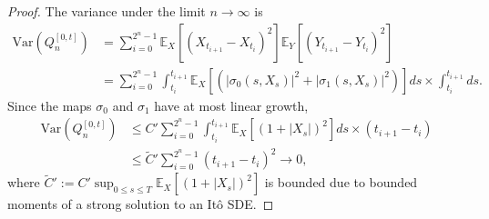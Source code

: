 \documentclass[12pt]{amsart}
\theoremstyle{definition}
\theoremstyle{remark}
\begin{document}
\begin{proof}
    The variance under the limit $n\to\infty$ is
    \begin{align*}
        \text{Var}(Q_n^{[0,t]}) &= \sum_{i=0}^{2^n-1} \mathbb{E}_X[(X_{t_{i+1}}-X_{t_i})^2]\mathbb{E}_Y[(Y_{t_{i+1}}-Y_{t_i})^2] \\
        &= \sum_{i=0}^{2^n-1}\int_{t_i}^{t_{i+1}}\mathbb{E}_X\left[(|\sigma_0(s,X_s)|^2+|\sigma_1(s,X_s)|^2)\right]ds\times\int_{t_i}^{t_{i+1}}ds.
    \end{align*}
    Since the maps $\sigma_0$ and $\sigma_1$ have at most linear growth,
    \begin{align*}
        \text{Var}(Q_n^{[0,t]}) &\leq C'\sum_{i=0}^{2^n-1}\int_{t_i}^{t_{i+1}}\mathbb{E}_X[(1+|X_s|)^2]ds\times (t_{i+1}-t_i)\\
        &\leq \tilde{C}'\sum_{i=0}^{2^n-1}(t_{i+1}-t_i)^2\to 0,
    \end{align*}
    where $\tilde{C}' := C'\sup_{0\leq s\leq T}\mathbb{E}_X[(1+|X_s|)^2]$ is bounded due to bounded moments of a strong solution to an It\^o SDE.


\end{proof}
\end{document}
